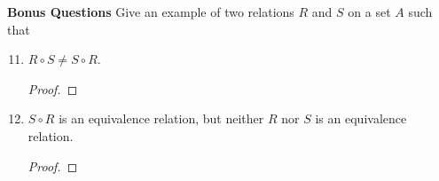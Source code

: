 \documentclass{article}
\begin{document}
  \textbf{Bonus Questions}
  Give an example of two relations $R$ and $S$ on a set $A$ such that \\
  \begin{enumerate} \setcounter{enumi}{10}
    \item $R \circ S \neq S \circ R$.
      \begin{proof}
        
      \end{proof}
    \item $S \circ R$ is an equivalence relation, but neither $R$ nor $S$ is an equivalence relation.
      \begin{proof}
        
      \end{proof}
   \end{enumerate}
\end{document}
